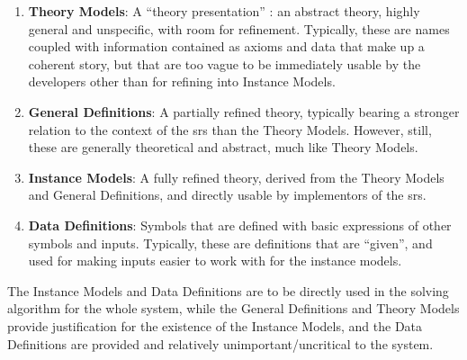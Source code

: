 
\begin{enumerate}

	\item \textbf{Theory Models}: A ``theory presentation'' : an abstract theory, highly general and
	      unspecific, with room for refinement. Typically, these are names
	      coupled with information contained as axioms and data that make up
	      a coherent story, but that are too vague to be immediately usable
	      by the developers other than for refining into Instance Models.

	\item \textbf{General Definitions}: A partially refined theory, typically bearing a stronger relation
	      to the context of the \acs{srs} than the Theory Models. However,
	      still, these are generally theoretical and abstract, much like Theory
	      Models.

	\item \textbf{Instance Models}: A fully refined theory, derived from the
	      Theory Models and General Definitions, and directly usable by
	      implementors of the \acs{srs}.

	\item \textbf{Data Definitions}: Symbols that are defined with basic
	      expressions of other symbols and inputs. Typically, these are
	      definitions that are ``given'', and used for making inputs easier to
	      work with for the instance models.

\end{enumerate}


The Instance Models and Data Definitions are to be directly used in the solving
algorithm for the whole system, while the General Definitions and Theory Models
provide justification for the existence of the Instance Models, and the Data
Definitions are provided and relatively unimportant/uncritical to the system.

